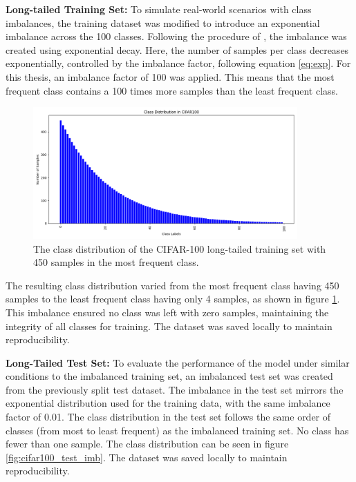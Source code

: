 \textbf{Long-tailed Training Set:} To simulate real-world scenarios with class imbalances, the training dataset was modified to introduce an exponential imbalance across the 100 classes. Following the procedure of \cite{cao2019learningimbalanceddatasetslabeldistributionaware}, the imbalance was created using exponential decay. Here, the number of samples per class decreases exponentially, controlled by the imbalance factor, following equation \eqref{eq:exp}. For this thesis, an imbalance factor of 100 was applied. This means that the most frequent class contains a 100 times more samples than the least frequent class. 

\begin{figure}[h!]
    \centering
    \includegraphics[width=0.9\textwidth]{Images/Plots/cifar100_train_450_imb.png}
    \caption{The class distribution of the CIFAR-100 long-tailed training set with 450 samples in the most frequent class.}
    \label{fig:cifar100_train_450_imb}
\end{figure}

The resulting class distribution varied from the most frequent class having 450 samples to the least frequent class having only 4 samples, as shown in figure \ref{fig:cifar100_train_450_imb}. This imbalance ensured no class was left with zero samples, maintaining the integrity of all classes for training. The dataset was saved locally to maintain reproducibility.


\textbf{Long-Tailed Test Set:} To evaluate the performance of the model under similar conditions to the imbalanced training set, an imbalanced test set was created from the previously split test dataset. The imbalance in the test set mirrors the exponential distribution used for the training data, with the same imbalance factor of 0.01. The class distribution in the test set follows the same order of classes (from most to least frequent) as the imbalanced training set. No class has fewer than one sample. The class distribution can be seen in figure \ref{fig:cifar100_test_imb}. The dataset was saved locally to maintain reproducibility.

